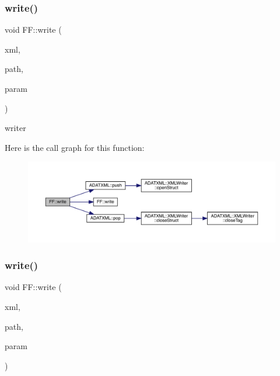 \subsubsection{\texorpdfstring{write()}{write()}\hspace{0.1cm}{\footnotesize\ttfamily [2/13]}}
{\footnotesize\ttfamily void F\+F\+::write (\begin{DoxyParamCaption}\item[{X\+M\+L\+Writer \&}]{xml,  }\item[{const std\+::string \&}]{path,  }\item[{const \mbox{\hyperlink{classFF_1_1DiscoValOperator__t}{Disco\+Val\+Operator\+\_\+t}} \&}]{param }\end{DoxyParamCaption})}



writer 

Here is the call graph for this function\+:\nopagebreak
\begin{figure}[H]
\begin{center}
\leavevmode
\includegraphics[width=350pt]{d5/da6/namespaceFF_a941e3f6fd9d8acd3d0c6b1f03c4be71b_cgraph}
\end{center}
\end{figure}
\mbox{\label{namespaceFF_a5f456c76a7fdfa1dd9305ebda8793354}} 
\subsubsection{\texorpdfstring{write()}{write()}\hspace{0.1cm}{\footnotesize\ttfamily [3/13]}}
{\footnotesize\ttfamily void F\+F\+::write (\begin{DoxyParamCaption}\item[{X\+M\+L\+Writer \&}]{xml,  }\item[{const std\+::string \&}]{path,  }\item[{const \mbox{\hyperlink{structFF_1_1PiPf}{Pi\+Pf}} \&}]{param }\end{DoxyParamCaption})}



